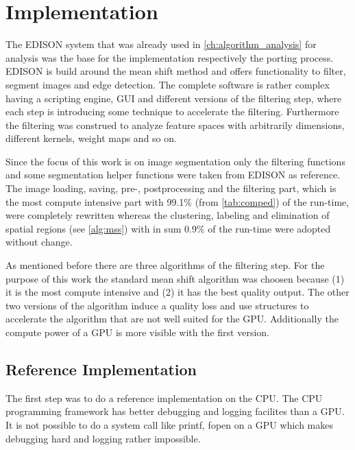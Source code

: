 \chapter{Implementation} %
\label{cha:implementation}

The \gls{EDISON} system that was already used in \autoref{ch:algorithm_analysis}
for analysis was the base for the implementation respectively the porting
process. \Gls{EDISON} is build around the mean shift method and offers
functionality to filter, segment images and edge detection. The complete
software is rather complex having a scripting engine, \gls{GUI} and different
versions of the filtering step, where each step is introducing some technique
to accelerate the filtering. Furthermore the filtering was construed to analyze
feature spaces with arbitrarily dimensions, different kernels, weight maps and 
so on. 

Since the focus of this work is on image segmentation only the filtering
functions and some segmentation helper functions were taken from \gls{EDISON} as
reference. The image loading, saving, pre-, postprocessing and the filtering
part, which is the most compute intensive part with 99.1\% (from
\autoref{tab:comped}) of the run-time, were completely rewritten whereas the
clustering, labeling and elimination of spatial regions (see \autoref{alg:mss})
with in sum 0.9\% of the run-time were adopted without change.

As mentioned before there are three algorithms of the filtering step. For the
purpose of this work the standard mean shift algorithm was choosen because (1)
it is the most compute intensive and (2) it has the best quality output. The other
two versions of the algorithm induce a quality loss and use structures to 
accelerate the algorithm that are not well suited for the \gls{GPU}. Additionally
the compute power of a \gls{GPU} is more visible with the first version. 

\section{Reference Implementation} %
\label{sec:reference_implementation}

The first step was to do a reference implementation on the \gls{CPU}. The
\gls{CPU} programming framework has better debugging and logging facilites
than a \gls{GPU}. It is not possible to do a system call like \textsf{printf}, 
\textsf{fopen} on a \gls{GPU} which makes debugging hard and logging rather 
impossible. 


